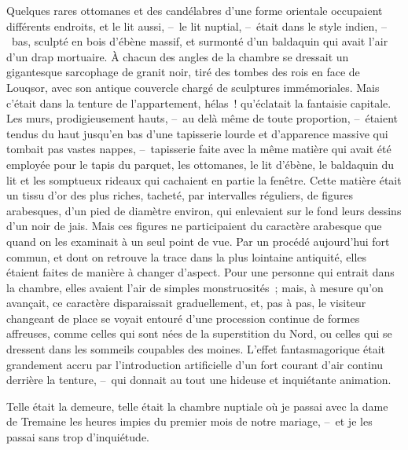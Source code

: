 \documentclass[french,twoside]{book} %
\begin{document}
Quelques rares ottomanes et des candélabres d’une forme orientale occupaient différents endroits, et le lit aussi, – le lit nuptial, – était dans le style indien, – bas, sculpté en bois d’ébène massif, et surmonté d’un baldaquin qui avait l’air d’un drap mortuaire. À chacun des angles de la chambre se dressait un gigantesque sarcophage de granit noir, tiré des tombes des rois en face de Louqsor, avec son antique couvercle chargé de sculptures immémoriales. Mais c’était dans la tenture de l’appartement, hélas ! qu’éclatait la fantaisie capitale. Les murs, prodigieusement hauts, – au delà même de toute proportion, – étaient tendus du haut jusqu’en bas d’une tapisserie lourde et d’apparence massive qui tombait pas vastes nappes, – tapisserie faite avec la même matière qui avait été employée pour le tapis du parquet, les ottomanes, le lit d’ébène, le baldaquin du lit et les somptueux rideaux qui cachaient en partie la fenêtre. Cette matière était un tissu d’or des plus riches, tacheté, par intervalles réguliers, de figures arabesques, d’un pied de diamètre environ, qui enlevaient sur le fond leurs dessins d’un noir de jais. Mais ces figures ne participaient du caractère arabesque que quand on les examinait à un seul point de vue. Par un procédé aujourd’hui fort commun, et dont on retrouve la trace dans la plus lointaine antiquité, elles étaient faites de manière à changer d’aspect. Pour une personne qui entrait dans la chambre, elles avaient l’air de simples monstruosités ; mais, à mesure qu’on avançait, ce caractère disparaissait graduellement, et, pas à pas, le visiteur changeant de place se voyait entouré d’une procession continue de formes affreuses, comme celles qui sont nées de la superstition du Nord, ou celles qui se dressent dans les sommeils coupables des moines. L’effet fantasmagorique était grandement accru par l’introduction artificielle d’un fort courant d’air continu derrière la tenture, – qui donnait au tout une hideuse et inquiétante animation.\par
Telle était la demeure, telle était la chambre nuptiale où je passai avec la dame de Tremaine les heures impies du premier mois de notre mariage, – et je les passai sans trop d’inquiétude.\par
\end{document}
